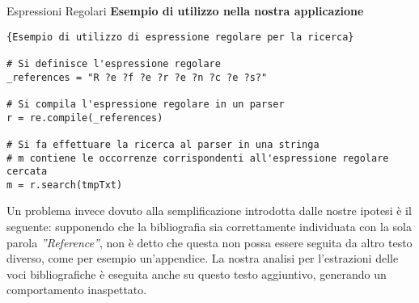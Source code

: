 \begin{subsubsection}{Espressioni Regolari}
\textbf{Esempio di utilizzo nella nostra applicazione}
\begin{lstlisting}[frame=r,caption=Esempio di utilizzo di espressione regolare per la ricerca ,breaklines=true,basicstyle=\small]{Esempio di utilizzo di espressione regolare per la ricerca}

# Si definisce l'espressione regolare
_references = "R ?e ?f ?e ?r ?e ?n ?c ?e ?s?"

# Si compila l'espressione regolare in un parser
r = re.compile(_references)

# Si fa effettuare la ricerca al parser in una stringa
# m contiene le occorrenze corrispondenti all'espressione regolare cercata
m = r.search(tmpTxt)
\end{lstlisting}

\end{subsubsection}

Un problema invece dovuto alla semplificazione introdotta dalle nostre ipotesi è il seguente: supponendo che la bibliografia sia correttamente individuata con la sola parola \textit{''Reference''}, non è detto che questa non possa essere seguita da altro testo diverso, come per esempio un'appendice. La nostra analisi per l'estrazioni delle voci bibliografiche è eseguita anche su questo testo aggiuntivo, generando un comportamento inaspettato.

